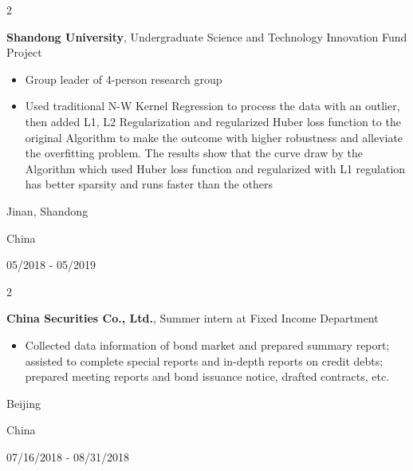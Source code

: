 \documentclass[10pt, letterpaper]{article}
\newenvironment{highlights}{
    \begin{itemize}[
        topsep=0.10 cm,
        parsep=0.10 cm,
        partopsep=0pt,
        itemsep=0pt,
        leftmargin=0.4 cm + 10pt
    ]
}{
    \end{itemize}
} %
\newenvironment{twocolentry}[2][]{
    \onecolentry
    \def\secondColumn{#2}
    \setcolumnwidth{\fill, 4.5 cm}
    \begin{paracol}{2}
}{
    \switchcolumn \raggedleft \secondColumn
    \end{paracol}
    \endonecolentry
} %
\begin{document}
        \begin{twocolentry}{
            Jinan, Shandong

            China

            05/2018 - 05/2019
        }
            \textbf{Shandong University}, Undergraduate Science and Technology Innovation Fund Project
            \begin{highlights}
                \item Group leader of 4-person research group
                \item Used traditional N-W Kernel Regression to process the data with an outlier, then added L1, 
                L2 Regularization and regularized Huber loss function to the original Algorithm to make the outcome
                with higher robustness and alleviate the overfitting problem. The results show that the curve draw by
                the Algorithm which used Huber loss function and regularized with L1 regulation has better sparsity
                and runs faster than the others
            \end{highlights}
        \end{twocolentry}


        \begin{twocolentry}{
            Beijing

            China

            07/16/2018 - 08/31/2018
        }
            \textbf{China Securities Co., Ltd.}, Summer intern at Fixed Income Department
            \begin{highlights}
                \item Collected data information of bond market and prepared summary report; assisted to
                complete special reports and in-depth reports on credit debts; prepared meeting reports and bond
                issuance notice, drafted contracts, etc.
            \end{highlights}
        \end{twocolentry}



    



        
\end{document}
